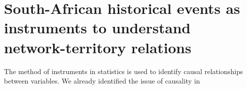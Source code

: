 
\newpage

\section[South-African historical events as instruments]{South-African historical events as instruments to understand network-territory relations}

The method of instruments in statistics is used to identify causal relationships between variables. We already identified the issue of causality in 







